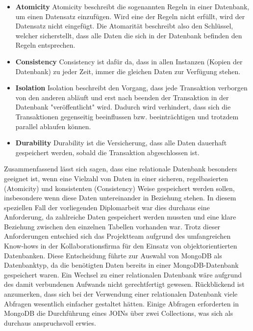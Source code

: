 \begin{itemize}
    \item \textbf{Atomicity}
        \newline
        Atomicity beschreibt die sogenannten Regeln in einer Datenbank, um einen Datensatz einzufügen. Wird eine der Regeln nicht erfüllt, wird der Datensatz nicht eingefügt. Die Atomarität beschreibt also den Schlüssel, welcher sicherstellt, dass alle Daten die sich in der Datenbank befinden den Regeln entsprechen.
    \item \textbf{Consistency}
        \newline
       Consistency ist dafür da, dass in allen Instanzen (Kopien der Datenbank) zu jeder Zeit, immer die gleichen Daten zur Verfügung stehen.
    \item \textbf{Isolation}
        \newline
        Isolation beschreibt den Vorgang, dass jede Transaktion verborgen von den anderen abläuft und erst nach beenden der Transaktion in der Datenbank "veröffentlicht" wird. Dadurch wird verhindert, dass sich die Transaktionen gegenseitig beeinflussen bzw. beeinträchtigen und trotzdem parallel ablaufen können.
    \item \textbf{Durability}
        \newline
        Durability ist die Versicherung, dass alle Daten dauerhaft gespeichert werden, sobald die Transaktion abgeschlossen ist.
\end{itemize}
Zusammenfassend lässt sich sagen, dass eine relationale Datenbank besonders geeignet ist, wenn eine Vielzahl von Daten in einer sicheren, regelbasierten (Atomicity) und konsistenten (Consistency) Weise gespeichert werden sollen, insbesondere wenn diese Daten untereinander in Beziehung stehen. In diesem speziellen Fall der vorliegenden Diplomarbeit war dies durchaus eine Anforderung, da zahlreiche Daten gespeichert werden mussten und eine klare Beziehung zwischen den einzelnen Tabellen vorhanden war.
\newline
Trotz dieser Anforderungen entschied sich das Projektteam aufgrund des umfangreichen Know-hows in der Kollaborationsfirma für den Einsatz von objektorientierten Datenbanken. Diese Entscheidung führte zur Auswahl von MongoDB als Datenbanktyp, da die benötigten Daten bereits in einer MongoDB-Datenbank gespeichert waren. Ein Wechsel zu einer relationalen Datenbank wäre aufgrund des damit verbundenen Aufwands nicht gerechtfertigt gewesen.
\newline
Rückblickend ist anzumerken, dass sich bei der Verwendung einer relationalen Datenbank viele Abfragen wesentlich einfacher gestaltet hätten. Einige Abfragen erforderten in MongoDB die Durchführung eines JOINs über zwei Collections, was sich als durchaus anspruchsvoll erwies.
